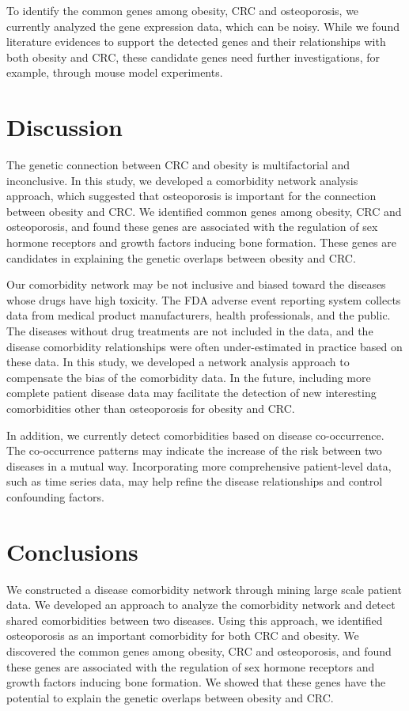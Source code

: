 To identify the common genes among obesity, CRC and osteoporosis, we currently analyzed the gene expression data, which can be noisy. While we found literature evidences to support the detected genes and their relationships with both obesity and CRC, these candidate genes need further investigations, for example, through mouse model experiments.

\section{D\lowercase{ISCUSSION}}
The genetic connection between CRC and obesity is multifactorial and inconclusive. In this study, we developed a comorbidity network analysis approach, which suggested that  osteoporosis is important for the connection between obesity and CRC. We identified common genes among obesity, CRC and osteoporosis, and found these genes are associated with the regulation of sex hormone receptors and growth factors inducing bone formation. These genes are candidates in explaining the genetic overlaps between obesity and CRC.

Our comorbidity network may be not inclusive and biased toward the diseases whose drugs have high toxicity. The FDA adverse event reporting system collects data from medical product manufacturers, health professionals, and the public. The diseases without drug treatments are not included in the data, and the disease comorbidity relationships were often under-estimated in practice based on these data. In this study, we developed a network analysis approach to compensate the bias of the comorbidity data. In the future, including more complete patient disease data may facilitate the detection of new interesting comorbidities other than osteoporosis for obesity and CRC.

In addition, we currently detect comorbidities based on disease co-occurrence. The co-occurrence patterns may indicate the increase of the risk between two diseases in a mutual way. Incorporating more comprehensive patient-level data, such as time series data, may help refine the disease relationships and control confounding factors.

\section{Conclusions}
We constructed a disease comorbidity network through mining large scale patient data.
We developed an approach to analyze the comorbidity network and detect shared comorbidities between two diseases.
Using this approach, we identified osteoporosis as an important comorbidity for both
CRC and obesity. We discovered the common genes among obesity, CRC and osteoporosis,
and found these genes are associated with the regulation of sex hormone receptors and growth factors inducing bone formation.
We showed that these genes have the potential to explain the genetic overlaps between obesity and CRC.


